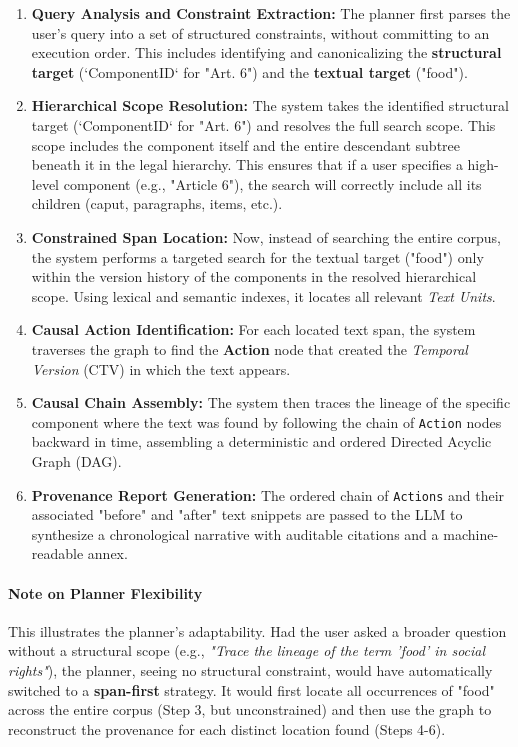 \documentclass[11pt]{article}
\begin{document}
\begin{enumerate}
    \item \textbf{Query Analysis and Constraint Extraction:} The planner first parses the user's query into a set of structured constraints, without committing to an execution order. This includes identifying and canonicalizing the \textbf{structural target} (`ComponentID` for "Art. 6") and the \textbf{textual target} ("food").

    \item \textbf{Hierarchical Scope Resolution:} The system takes the identified structural target (`ComponentID` for "Art. 6") and resolves the full search scope. This scope includes the component itself and the entire descendant subtree beneath it in the legal hierarchy. This ensures that if a user specifies a high-level component (e.g., "Article 6"), the search will correctly include all its children (caput, paragraphs, items, etc.).

    \item \textbf{Constrained Span Location:} Now, instead of searching the entire corpus, the system performs a targeted search for the textual target ("food") only within the version history of the components in the resolved hierarchical scope. Using lexical and semantic indexes, it locates all relevant \textit{Text Units}.

    \item \textbf{Causal Action Identification:} For each located text span, the system traverses the graph to find the \textbf{Action} node that created the \textit{Temporal Version} (CTV) in which the text appears.

    \item \textbf{Causal Chain Assembly:} The system then traces the lineage of the specific component where the text was found by following the chain of \texttt{Action} nodes backward in time, assembling a deterministic and ordered Directed Acyclic Graph (DAG).

    \item \textbf{Provenance Report Generation:} The ordered chain of \texttt{Actions} and their associated "before" and "after" text snippets are passed to the LLM to synthesize a chronological narrative with auditable citations and a machine-readable annex.
\end{enumerate}

\paragraph{Note on Planner Flexibility}
This illustrates the planner's adaptability. Had the user asked a broader question without a structural scope (e.g., \textit{"Trace the lineage of the term 'food' in social rights"}), the planner, seeing no structural constraint, would have automatically switched to a \textbf{span-first} strategy. It would first locate all occurrences of "food" across the entire corpus (Step 3, but unconstrained) and then use the graph to reconstruct the provenance for each distinct location found (Steps 4-6).
\end{document}
